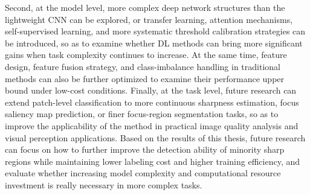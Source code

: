 \par Second, at the model level, more complex deep network structures than the
lightweight CNN can be explored, or transfer learning, attention mechanisms,
self-supervised learning, and more systematic threshold calibration strategies
can be introduced, so as to examine whether DL methods can bring more
significant gains when task complexity continues to increase. At the same time,
feature design, feature fusion strategy, and class-imbalance handling in
traditional methods can also be further optimized to examine their performance
upper bound under low-cost conditions. Finally, at the task level, future
research can extend patch-level classification to more continuous sharpness
estimation, focus saliency map prediction, or finer focus-region segmentation
tasks, so as to improve the applicability of the method in practical image
quality analysis and visual perception applications. Based on the results of
this thesis, future research can focus on how to further improve the detection
ability of minority sharp regions while maintaining lower labeling cost and
higher training efficiency, and evaluate whether increasing model complexity
and computational resource investment is really necessary in more complex
tasks.
